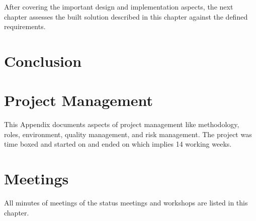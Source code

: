 \documentclass[hsr-ba,english]{hgbthesis}
\begin{document}
\bigskip
After covering the important design and implementation aspects, the next chapter assesses the built solution described in this chapter against the defined requirements.

\chapter{Conclusion}


\appendix

\chapter{Project Management}
\label{cha:projectmgmt}

This Appendix documents aspects of project management like methodology, roles, environment, quality management, and risk management. The project was time boxed and started on  and ended on  which implies 14 working weeks. 




\chapter{Meetings}

All minutes of meetings of the status meetings and workshops are listed in
this chapter.




%
%
%


%



\printglossaries


\MakeBibliography
\end{document}
